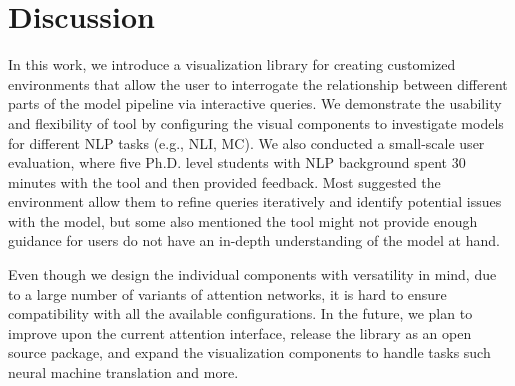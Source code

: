 \section{Discussion}
In this work, we introduce a visualization library for creating customized environments that allow the user to interrogate the relationship between different parts of the model pipeline via interactive queries.
%
We demonstrate the usability and flexibility of tool by configuring the visual components to investigate models for different NLP tasks (e.g., NLI, MC).
%
We also conducted a small-scale user evaluation, where five Ph.D. level students with NLP background spent 30 minutes with the tool and then provided feedback. Most suggested the environment allow them to refine queries iteratively and identify potential issues with the model, but some also mentioned the tool might not provide enough guidance for users do not have an in-depth understanding of the model at hand.

Even though we design the individual components with versatility in mind, due to a large number of variants of attention networks, it is hard to ensure compatibility with all the available configurations.
%
In the future, we plan to improve upon the current attention interface, release the library as an open source package, and expand the visualization components to handle tasks such neural machine translation and more. 
